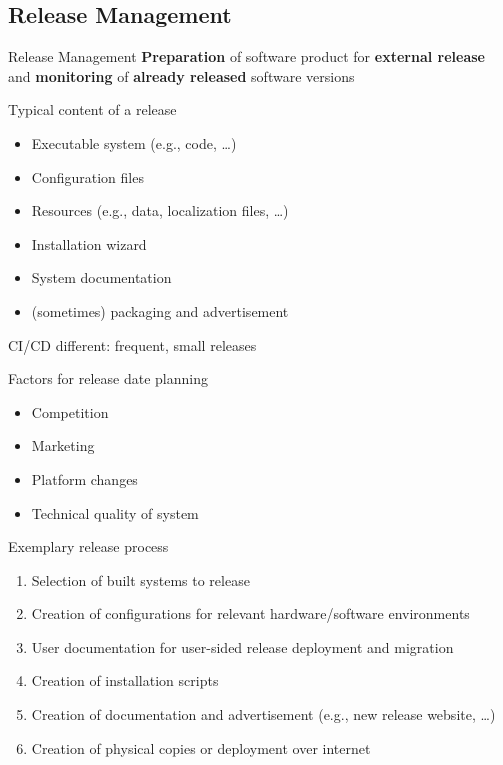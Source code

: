 \subsection{Release Management}
\begin{frame}{\insertsubsection  \mytitlesource{\sommerville}}
	\begin{fancycolumns}[animation=none]
		\begin{definition}{Release Management}
			\textbf{Preparation} of software product for \textbf{external release} and  \textbf{monitoring} of \textbf{already released} software versions
		\end{definition}\pause
		
		\begin{note}{Typical content of a release}
			\begin{itemize}
				\item Executable system (e.g., code, \dots)
				\item Configuration files
				\item Resources (e.g., data, localization files, \dots)
				\item Installation wizard
				\item System documentation
				\item (sometimes) packaging and advertisement
			\end{itemize}
		\end{note}\pause
		\begin{note}{CI/CD}
			different: frequent, small releases
		\end{note}
		\nextcolumn
		\vspace{-7mm}
		\begin{note}{Factors for release date planning}
			\begin{itemize}
				\item Competition
				\item Marketing
				\item Platform changes
				\item Technical quality of system
			\end{itemize}
		\end{note} \pause
		
		\begin{note}{Exemplary release process}
			\begin{enumerate}
				\item Selection of built systems to release
				\item Creation of configurations for relevant hardware/software environments
				\item User documentation for user-sided release deployment and migration
				\item Creation of installation scripts
				\item Creation of documentation and advertisement (e.g., new release website, \dots)
				\item Creation of physical copies or deployment over internet
			\end{enumerate}
		\end{note}
	\end{fancycolumns}
\end{frame}

